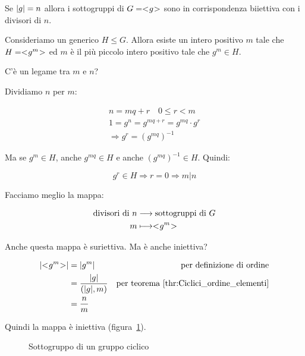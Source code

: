 \begin{teorema}
	\label{thr:ciclici_finiti_sottogruppi}
	Se $\lvert g \rvert = n$ allora i sottogruppi di $G = < \negmedspace g \negmedspace >$ sono in corrispondenza biiettiva con i divisori di $n$.
\end{teorema}
\begin{dimostrazione}
	Consideriamo un generico $H \le G$. Allora esiste un intero positivo $m$ tale che $H = < \negmedspace g^m \negmedspace >$ ed $m$ è il più piccolo intero positivo tale che $g^m \in H$.
	
	C'è un legame tra $m$ e $n$?
	
	Dividiamo $n$ per $m$:
	
	\begin{gather}
		n = mq + r \quad 0 \le r < m \\
		1 = g^n = g^{mq+r} = g^{mq} \cdot g^r \\
		\Longrightarrow g^r = (g^{mq})^{-1}
	\end{gather}

	Ma se $g^m \in H$, anche $g^{mq} \in H$ e anche $(g^{mq})^{-1} \in H$. Quindi:
	
	\begin{equation}
		g^r \in H \Longrightarrow r = 0 \Longrightarrow m|n
	\end{equation}

	Facciamo meglio la mappa:
	
	\begin{align}
		\text{divisori di }n &\longrightarrow \text{sottogruppi di }G \\
		m &\longmapsto < \negmedspace g^m \negmedspace >
	\end{align}

	Anche questa mappa è suriettiva. Ma è anche iniettiva?
	
	\begin{align}
		\lvert < \negmedspace g^m \negmedspace > \rvert &= \lvert g^m \rvert & \text{per definizione di ordine} \\
		&= \dfrac{\lvert g \rvert}{ ( \lvert g \rvert , m ) } & \text{per teorema~\ref{thr:Ciclici_ordine_elementi}} \\
		&= \dfrac{n}{m}
	\end{align}

	Quindi la mappa è iniettiva (figura~\ref{fig:Ciclici_divisori_di_n}).
		
\end{dimostrazione}

\begin{figure}[tp]
	\centering
	\caption{Sottogruppo di un gruppo ciclico}
	\label{fig:Ciclici_divisori_di_n}
\end{figure}

